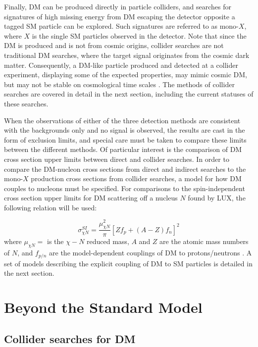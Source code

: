 \indent Finally, DM can be produced directly in particle colliders, and searches for signatures of high missing energy from DM escaping the detector opposite a tagged SM particle can be explored. Such signatures are referred to as mono-$X$, where $X$ is the single SM particles observed in the detector. Note that since the DM is produced and is not from cosmic origins, collider searches are not traditional DM searches, where the target signal originates from the cosmic dark matter. Consequently, a DM-like particle produced and detected at a collider experiment, displaying some of the expected properties, may mimic cosmic DM, but may not be stable on cosmological time scales \cite{Askew:2014kqa}. The methods of collider searches are covered in detail in the next section, including the current statuses of these searches. 

\indent When the observations of either of the three detection methods are consistent with the backgrounds only and no signal is observed, the results are cast in the form of exclusion limits, and special care must be taken to compare these limits between the different methods. Of particular interest is the comparison of DM cross section upper limits between direct and collider searches. In order to compare the DM-nucleon cross sections from direct and indirect searches to the mono-$X$ production cross sections from collider searches, a model for how DM couples to nucleons must be specified. For comparisons to the spin-independent cross section upper limits for DM scattering off a nucleus $N$ found by LUX, the following relation will be used:

\begin{equation}
\sigma^{SI}_{\chi N} = \frac{\mu^2_{\chi N}}{\pi} [Zf_p + (A-Z)f_n]^2
\end{equation}
where $\mu_{\chi N} = $ is the $\chi-N$ reduced mass, $A$ and $Z$ are the atomic mass numbers of $N$, and $f_{p/n}$ are the model-dependent couplings of DM to protons/neutrons \cite{Carpenter:2013xra}. A set of models describing the explicit coupling of DM to SM particles is detailed in the next section.

\section{Beyond the Standard Model}

\subsection{Collider searches for DM}

